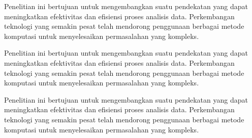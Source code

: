 Penelitian ini bertujuan untuk mengembangkan suatu pendekatan yang dapat meningkatkan efektivitas dan efisiensi proses analisis data. Perkembangan teknologi yang semakin pesat telah mendorong penggunaan berbagai metode komputasi untuk menyelesaikan permasalahan yang kompleks.

Penelitian ini bertujuan untuk mengembangkan suatu pendekatan yang dapat meningkatkan efektivitas dan efisiensi proses analisis data. Perkembangan teknologi yang semakin pesat telah mendorong penggunaan berbagai metode komputasi untuk menyelesaikan permasalahan yang kompleks.

Penelitian ini bertujuan untuk mengembangkan suatu pendekatan yang dapat meningkatkan efektivitas dan efisiensi proses analisis data. Perkembangan teknologi yang semakin pesat telah mendorong penggunaan berbagai metode komputasi untuk menyelesaikan permasalahan yang kompleks.
